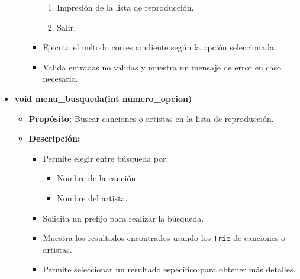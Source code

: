 \documentclass[corference]{IEEEtran}
\begin{document}
\begin{flushleft}
\begin{itemize}
\begin{itemize}
\begin{itemize}
\begin{enumerate}
                            \item Impresión de la lista de reproducción.
                            \item Salir.
                        \end{enumerate}
                        \item Ejecuta el método correspondiente según la opción seleccionada.
                        \item Valida entradas no válidas y muestra un mensaje de error en caso necesario.
                    \end{itemize}
                \end{itemize}
            
                \item \textbf{void menu\_busqueda(int numero\_opcion)}
                \begin{itemize}
                    \item \textbf{Propósito:} 
                    Buscar canciones o artistas en la lista de reproducción.
                    \item \textbf{Descripción:} 
                    \begin{itemize}
                        \item Permite elegir entre búsqueda por:
                        \begin{itemize}
                            \item Nombre de la canción.
                            \item Nombre del artista.
                        \end{itemize}
                        \item Solicita un prefijo para realizar la búsqueda.
                        \item Muestra los resultados encontrados usando los \texttt{Trie} de canciones o artistas.
                        \item Permite seleccionar un resultado específico para obtener más detalles.
                    \end{itemize}
                \end{itemize}
            

\end{itemize}
\end{flushleft}
\end{document}
